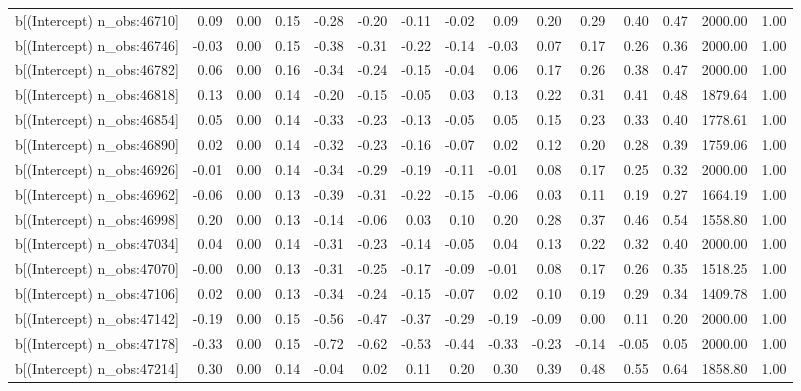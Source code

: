 \begin{table}[ht]
\begin{tabular}{rrrrrrrrrrrrrrr}
  b[(Intercept) n\_obs:46710] & 0.09 & 0.00 & 0.15 & -0.28 & -0.20 & -0.11 & -0.02 & 0.09 & 0.20 & 0.29 & 0.40 & 0.47 & 2000.00 & 1.00 \\ 
  b[(Intercept) n\_obs:46746] & -0.03 & 0.00 & 0.15 & -0.38 & -0.31 & -0.22 & -0.14 & -0.03 & 0.07 & 0.17 & 0.26 & 0.36 & 2000.00 & 1.00 \\ 
  b[(Intercept) n\_obs:46782] & 0.06 & 0.00 & 0.16 & -0.34 & -0.24 & -0.15 & -0.04 & 0.06 & 0.17 & 0.26 & 0.38 & 0.47 & 2000.00 & 1.00 \\ 
  b[(Intercept) n\_obs:46818] & 0.13 & 0.00 & 0.14 & -0.20 & -0.15 & -0.05 & 0.03 & 0.13 & 0.22 & 0.31 & 0.41 & 0.48 & 1879.64 & 1.00 \\ 
  b[(Intercept) n\_obs:46854] & 0.05 & 0.00 & 0.14 & -0.33 & -0.23 & -0.13 & -0.05 & 0.05 & 0.15 & 0.23 & 0.33 & 0.40 & 1778.61 & 1.00 \\ 
  b[(Intercept) n\_obs:46890] & 0.02 & 0.00 & 0.14 & -0.32 & -0.23 & -0.16 & -0.07 & 0.02 & 0.12 & 0.20 & 0.28 & 0.39 & 1759.06 & 1.00 \\ 
  b[(Intercept) n\_obs:46926] & -0.01 & 0.00 & 0.14 & -0.34 & -0.29 & -0.19 & -0.11 & -0.01 & 0.08 & 0.17 & 0.25 & 0.32 & 2000.00 & 1.00 \\ 
  b[(Intercept) n\_obs:46962] & -0.06 & 0.00 & 0.13 & -0.39 & -0.31 & -0.22 & -0.15 & -0.06 & 0.03 & 0.11 & 0.19 & 0.27 & 1664.19 & 1.00 \\ 
  b[(Intercept) n\_obs:46998] & 0.20 & 0.00 & 0.13 & -0.14 & -0.06 & 0.03 & 0.10 & 0.20 & 0.28 & 0.37 & 0.46 & 0.54 & 1558.80 & 1.00 \\ 
  b[(Intercept) n\_obs:47034] & 0.04 & 0.00 & 0.14 & -0.31 & -0.23 & -0.14 & -0.05 & 0.04 & 0.13 & 0.22 & 0.32 & 0.40 & 2000.00 & 1.00 \\ 
  b[(Intercept) n\_obs:47070] & -0.00 & 0.00 & 0.13 & -0.31 & -0.25 & -0.17 & -0.09 & -0.01 & 0.08 & 0.17 & 0.26 & 0.35 & 1518.25 & 1.00 \\ 
  b[(Intercept) n\_obs:47106] & 0.02 & 0.00 & 0.13 & -0.34 & -0.24 & -0.15 & -0.07 & 0.02 & 0.10 & 0.19 & 0.29 & 0.34 & 1409.78 & 1.00 \\ 
  b[(Intercept) n\_obs:47142] & -0.19 & 0.00 & 0.15 & -0.56 & -0.47 & -0.37 & -0.29 & -0.19 & -0.09 & 0.00 & 0.11 & 0.20 & 2000.00 & 1.00 \\ 
  b[(Intercept) n\_obs:47178] & -0.33 & 0.00 & 0.15 & -0.72 & -0.62 & -0.53 & -0.44 & -0.33 & -0.23 & -0.14 & -0.05 & 0.05 & 2000.00 & 1.00 \\ 
  b[(Intercept) n\_obs:47214] & 0.30 & 0.00 & 0.14 & -0.04 & 0.02 & 0.11 & 0.20 & 0.30 & 0.39 & 0.48 & 0.55 & 0.64 & 1858.80 & 1.00 \\ 

\end{tabular}
\end{table}
